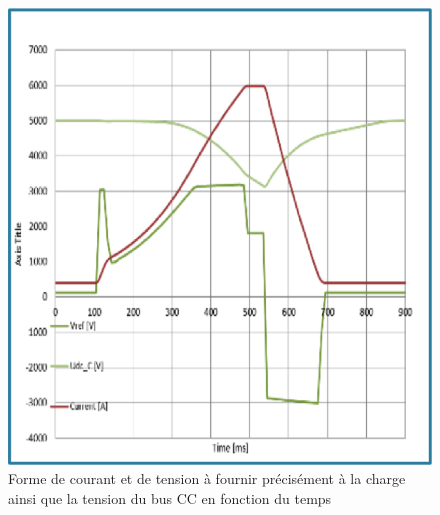 \begin{figure}[htb]
\centering
\includegraphics[scale=0.5]{fig/Iref.png}
\caption{Forme de courant et de tension à fournir précisément à la charge ainsi que la tension du bus CC en fonction du temps}
\label{fig_Iref}
\end{figure}

